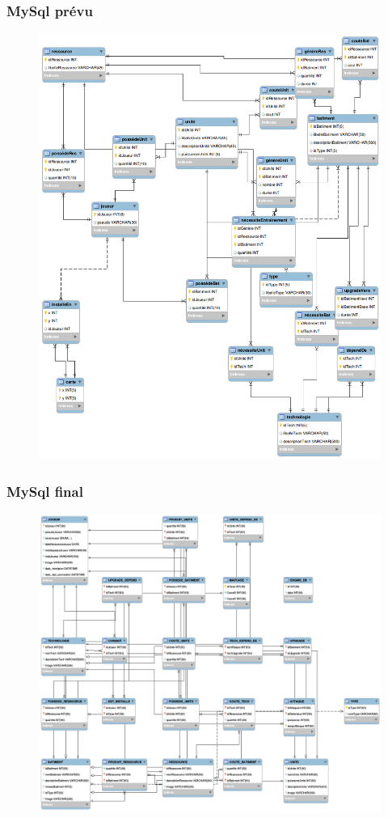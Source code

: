 \documentclass[11pt,a4paper]{article}
\begin{document}
\subsubsection{MySql prévu}
\begin{figure}[!h]
\includegraphics[scale=0.3]{./sql/last.png}
\end{figure}
\newpage\subsubsection{MySql final}
\begin{figure}[!h]
\includegraphics[scale=0.3]{./sql/final.png}
\end{figure}
\end{document}
